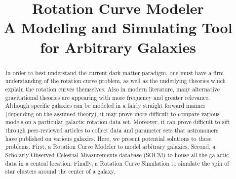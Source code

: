\documentclass[conference]{IEEEtran-modified}
\begin{document}
\title{Rotation Curve Modeler \\ \Large{A Modeling and Simulating Tool for Arbitrary Galaxies}}

\author{
\and
{}
}

\onecolumn

%	
%

	\maketitle
    \begin{abstract}
	
	In order to best understand the current dark matter paradigm, one must have a firm understanding of the rotation curve problem, as well as the underlying theories which explain the rotation curves themselves.  Also in modern literature, many alternative gravitational theories are appearing with more frequency and greater relevance. Although specific galaxies can be modeled in a fairly straight forward manner (depending on the assumed theory), it may prove more difficult to compare various models on a particular galactic rotation data set.  Moreover, it can prove difficult to sift through peer-reviewed articles to collect data and parameter sets that astronomers have published on various galaxies. Here, we present potential solutions to these problems.  First, a Rotation Curve Modeler to model arbitrary galaxies.  Second, a Scholarly Observed Celestial Measurements database (SOCM) to house all the galactic data in a central location.  Finally, a Rotation Curve Simulation to simulate the spin of star clusters around the center of a galaxy.
	\end{abstract}
	
\end{document}
